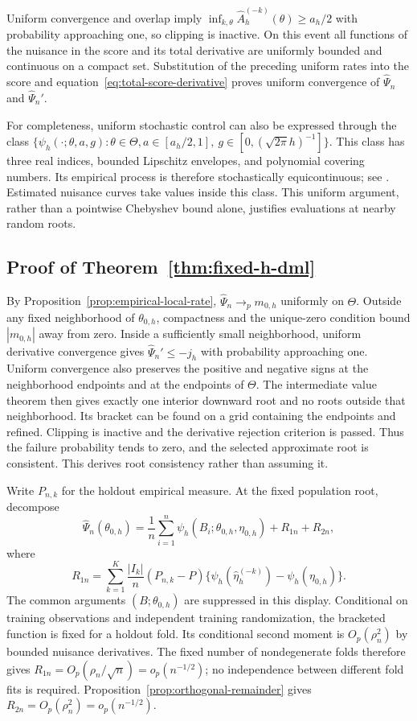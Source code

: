 Uniform convergence and overlap imply
$\inf_{k,\theta}\widehat A_h^{(-k)}(\theta)\geq a_h/2$ with probability
approaching one, so clipping is inactive. On this event all functions of the
nuisance in the score and its total derivative are uniformly bounded and
continuous on a compact set. Substitution of the preceding uniform rates
into the score and equation~\eqref{eq:total-score-derivative} proves uniform
convergence of $\widehat\Psi_n$ and $\widehat\Psi_n'$.

For completeness, uniform stochastic control can also be expressed through
the class $\{\psi_h(\cdot;\theta,a,g):\theta\in\Theta,
a\in[a_h/2,1],\ g\in[0,(\sqrt{2\pi}h)^{-1}]\}$. This class has three real
indices, bounded Lipschitz envelopes, and polynomial covering numbers. Its
empirical process is therefore stochastically equicontinuous; see
\citet{vandervaartwellner1996}. Estimated nuisance curves take values inside
this class. This uniform argument, rather than a pointwise Chebyshev bound
alone, justifies evaluations at nearby random roots.

\subsection{Proof of Theorem~\ref{thm:fixed-h-dml}}

By Proposition~\ref{prop:empirical-local-rate},
$\widehat\Psi_n\to_p m_{0,h}$ uniformly on $\Theta$. Outside any fixed
neighborhood of $\theta_{0,h}$, compactness and the unique-zero condition
bound $|m_{0,h}|$ away from zero. Inside a sufficiently small neighborhood,
uniform derivative convergence gives
$\widehat\Psi_n'\leq-j_h$ with probability approaching one. Uniform
convergence also preserves the positive and negative signs at the neighborhood
endpoints and at the endpoints of $\Theta$. The intermediate value theorem
then gives exactly one interior downward root and no roots outside that
neighborhood. Its bracket can be found on a grid containing the endpoints
and refined. Clipping is inactive and the derivative rejection criterion is
passed. Thus the failure probability tends to zero, and the selected
approximate root is consistent. This derives root consistency rather than
assuming it.

Write $P_{n,k}$ for the holdout empirical measure. At the fixed population
root, decompose
\begin{equation}
\widehat\Psi_n(\theta_{0,h})
=\frac1n\sum_{i=1}^n\psi_h(B_i;\theta_{0,h},\eta_{0,h})
+R_{1n}+R_{2n},
\end{equation}
where
\begin{equation}
R_{1n}=\sum_{k=1}^K\frac{|I_k|}{n}(P_{n,k}-P)
\{\psi_h(\widehat\eta_h^{(-k)})-\psi_h(\eta_{0,h})\}.
\end{equation}
The common arguments $(B;\theta_{0,h})$ are suppressed in this display.
Conditional on training observations and independent training randomization,
the bracketed function is fixed for a holdout fold. Its conditional second
moment is $O_p(\rho_n^2)$ by bounded nuisance derivatives. The fixed number
of nondegenerate folds therefore gives
$R_{1n}=O_p(\rho_n/\sqrt n)=o_p(n^{-1/2})$; no independence between
different fold fits is required. Proposition~\ref{prop:orthogonal-remainder}
gives $R_{2n}=O_p(\rho_n^2)=o_p(n^{-1/2})$.

